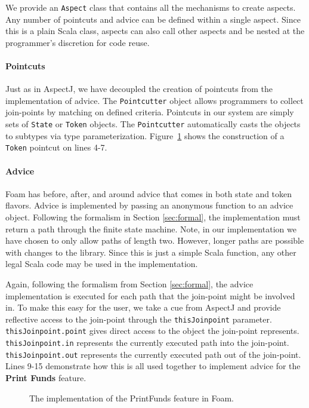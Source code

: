 \documentclass[sigplan,anonymous,review]{acmart}
\begin{document}
We provide an \texttt{Aspect} class that contains all the mechanisms to create aspects. Any number of pointcuts and advice can be defined within a single aspect. Since this is a plain Scala class, aspects can also call other aspects and be nested at the programmer's discretion for code reuse.

\paragraph{Pointcuts} Just as in AspectJ, we have decoupled the creation of pointcuts from the implementation of advice. The \texttt{Pointcutter} object allows programmers to collect join-points by matching on defined criteria. Pointcuts in our system are simply sets of \texttt{State} or \texttt{Token} objects. The \texttt{Pointcutter} automatically casts the objects to subtypes via type parameterization. Figure~\ref{lst:PrintFunds} shows the construction of a \texttt{Token} pointcut on lines 4-7.

\paragraph{Advice} Foam has before, after, and around advice that comes in both state and token flavors. Advice is implemented by passing an anonymous function to an advice object. Following the formalism in Section \ref{sec:formal}, the implementation must return a path through the finite state machine. Note, in our implementation we have chosen to only allow paths of length two. However, longer paths are possible with changes to the library. Since this is just a simple Scala function, any other legal Scala code may be used in the implementation. 

Again, following the formalism from Section \ref{sec:formal}, the advice implementation is executed for each path that the join-point might be involved in. To make this easy for the user, we take a cue from AspectJ and provide reflective access to the join-point through the \texttt{thisJoinpoint} parameter. \texttt{thisJoinpoint.point} gives direct access to the object the join-point represents. \texttt{thisJoinpoint.in} represents the currently executed path into the join-point. \texttt{thisJoinpoint.out} represents the currently executed path out of the join-point. Lines 9-15 demonstrate how this is all used together to implement advice for the \textbf{Print Funds} feature.

\begin{figure}[h]
    \centering
    
    \caption{The implementation of the PrintFunds feature in Foam.}
    \label{lst:PrintFunds}
\end{figure}
\end{document}

